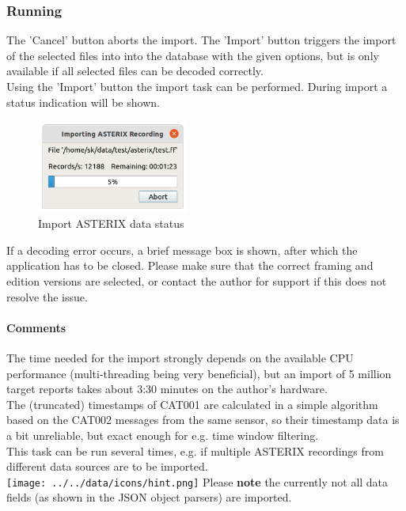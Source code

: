\subsubsection{Running}

The 'Cancel' button aborts the import.  The 'Import' button triggers the import of the selected files into into the database with the given options, but is only available if all selected files can be decoded correctly. \\

Using the 'Import' button the import task can be performed. During import a status indication will be shown. \\

\begin{figure}[H]
  \center
    \includegraphics[width=5cm]{figures/asterix_import_data_status.png}
  \caption{Import ASTERIX data status}
\end{figure}

If a decoding error occurs, a brief message box is shown, after which the application has to be closed. 
Please make sure that the correct framing and edition versions are selected, or contact the author for support if this does not resolve the issue. \\

\paragraph{Comments}
The time needed for the import strongly depends on the available CPU performance (multi-threading being very beneficial), but an import of 5 million target reports takes about 3:30 minutes on the author's hardware. \\

The (truncated) timestamps of CAT001 are calculated in a simple algorithm based on the CAT002 messages from the same sensor, so their timestamp data is a bit unreliable, but exact enough for e.g. time window filtering. \\

This task can be run several times, e.g. if multiple ASTERIX recordings from different data sources are to be imported. \\

\texttt{[image: ../../data/icons/hint.png]} Please \textbf{note} the currently not all data fields (as shown in the JSON object parsers) are imported.\\


